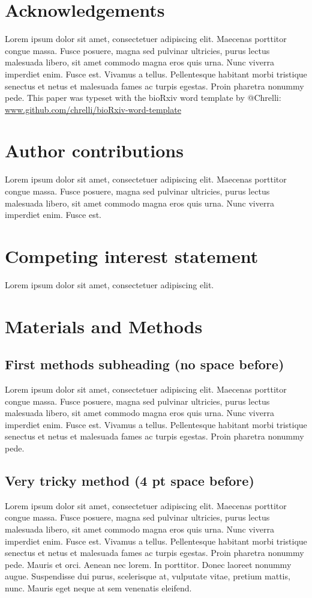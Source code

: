 \documentclass{biorxiv}
\begin{document}
\begin{methods}
\section*{Acknowledgements}
Lorem ipsum dolor sit amet, consectetuer adipiscing elit. Maecenas porttitor
congue massa. Fusce posuere, magna sed pulvinar ultricies, purus lectus
malesuada libero, sit amet commodo magna eros quis urna. Nunc viverra
imperdiet enim. Fusce est. Vivamus a tellus. Pellentesque habitant morbi
tristique senectus et netus et malesuada fames ac turpis egestas. Proin
pharetra nonummy pede. This paper was typeset with the bioRxiv word template
by @Chrelli: \url{www.github.com/chrelli/bioRxiv-word-template}

\section*{Author contributions}
Lorem ipsum dolor sit amet, consectetuer adipiscing elit. Maecenas porttitor
congue massa. Fusce posuere, magna sed pulvinar ultricies, purus lectus
malesuada libero, sit amet commodo magna eros quis urna. Nunc viverra
imperdiet enim. Fusce est.

\section*{Competing interest statement}
Lorem ipsum dolor sit amet, consectetuer adipiscing elit.

\section{Materials and Methods}
\subsection{First methods subheading (no space before)}
Lorem ipsum dolor sit amet, consectetuer adipiscing elit. Maecenas porttitor
congue massa. Fusce posuere, magna sed pulvinar ultricies, purus lectus
malesuada libero, sit amet commodo magna eros quis urna. Nunc viverra
imperdiet enim. Fusce est. Vivamus a tellus. Pellentesque habitant morbi
tristique senectus et netus et malesuada fames ac turpis egestas. Proin
pharetra nonummy pede.

\subsection{Very tricky method (4 pt space before)}
Lorem ipsum dolor sit amet, consectetuer adipiscing elit. Maecenas porttitor
congue massa. Fusce posuere, magna sed pulvinar ultricies, purus lectus
malesuada libero, sit amet commodo magna eros quis urna. Nunc viverra
imperdiet enim. Fusce est. Vivamus a tellus. Pellentesque habitant morbi
tristique senectus et netus et malesuada fames ac turpis egestas. Proin
pharetra nonummy pede. Mauris et orci. Aenean nec lorem. In porttitor. Donec
laoreet nonummy augue. Suspendisse dui purus, scelerisque at, vulputate vitae,
pretium mattis, nunc. Mauris eget neque at sem venenatis eleifend.


\end{methods}
\end{document}
